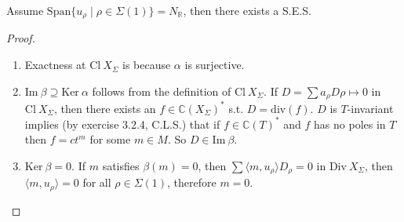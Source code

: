 \documentclass[a4paper,12pt]{amsart}
\newcommand{\ZZ}{\mathbb{Z}}
\newcommand{\RR}{\mathbb{R}}
\newcommand{\CC}{\mathbb{C}}
\begin{document}
\begin{theorem}
	Assume $\mathrm{Span}\{u_\rho\mid\rho\in\Sigma(1)\}=N_\RR$, then there exists a S.E.S.
	\begin{center}
	\end{center}
\end{theorem}
\begin{proof}
	\begin{enumerate}
		\item Exactness at $\mathrm{Cl}~X_\Sigma$ is because $\alpha$ is surjective.
		\item $\mathrm{Im}~\beta\supseteq\mathrm{Ker}~\alpha$ follows from the definition of $\mathrm{Cl}~X_\Sigma$. If $D=\sum a_\rho D\rho\mapsto0$ in $\mathrm{Cl}~X_\Sigma$, then there exists an $f\in\CC(X_\Sigma)^*$ s.t. $D=\mathrm{div}(f)$. $D$ is $T$-invariant implies (by exercise 3.2.4, C.L.S.) that if $f\in\CC(T)^*$ and $f$ has no poles in $T$ then $f=ct^m$ for some $m\in M$. So $D\in\mathrm{Im}~\beta$.
		\item $\mathrm{Ker}~\beta=0$. If $m$ satisfies $\beta(m)=0$, then $\sum\langle m,u_\rho\rangle D_\rho=0$ in $\mathrm{Div}~X_\Sigma$, then $\langle m,u_\rho\rangle=0$ for all $\rho\in\Sigma(1)$, therefore $m=0$.
	\end{enumerate}
\end{proof}
\end{document}
